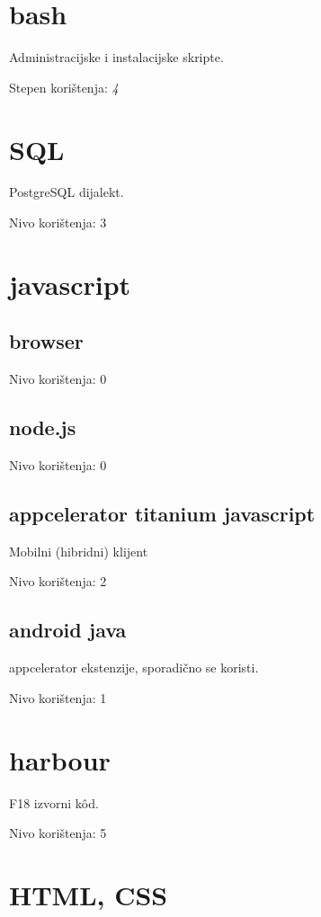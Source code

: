 \documentclass[times, utf8, seminar]{fit}
\begin{document}
\section{bash}

Administracijske i instalacijske skripte.

Stepen korištenja: \emph{4}

\section{SQL}

PostgreSQL dijalekt.

Nivo korištenja: 3

\section{javascript}

\subsection{browser}

Nivo korištenja: 0

\subsection{node.js}

Nivo korištenja: 0

\subsection{appcelerator titanium javascript}

Mobilni (hibridni) klijent

Nivo korištenja: 2

\subsection{android java}

appcelerator ekstenzije, sporadično se koristi.

Nivo korištenja: 1

\section{harbour}

F18 izvorni k\^od.

Nivo korištenja: 5

\section{HTML, CSS}
\end{document}

